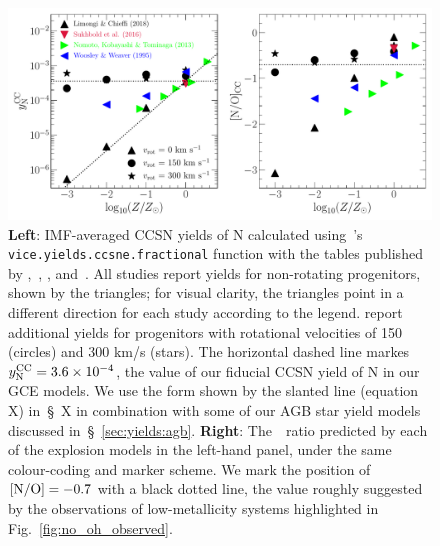 \documentclass[ms.tex]{subfiles}
\begin{document}
\begin{figure}
\centering
\includegraphics[scale = 0.63]{n_cc_yields.pdf}
\caption{
\textbf{Left}: IMF-averaged CCSN yields of N calculated using~\vice's
\texttt{vice.yields.ccsne.fractional} function with the tables published by
\citet[][blue]{Woosley1995},~\citet[][green]{Nomoto2013},
\citet[][red]{Sukhbold2016}, and~\citet[][black]{Limongi2018}.
All studies report yields for non-rotating progenitors, shown by the triangles;
for visual clarity, the triangles point in a different direction for each study
according to the legend.
\citet{Limongi2018} report additional yields for progenitors with rotational
velocities of 150 (circles) and 300 km/s (stars).
The horizontal dashed line markes~$y_\text{N}^\text{CC} = 3.6\times10^{-4}$,
the value of our fiducial CCSN yield of N in our GCE models.
We use the form shown by the slanted line (equation X) in~\S~X in combination
with some of our AGB star yield models discussed in~\S~\ref{sec:yields:agb}.
\textbf{Right}: The~\no~ratio predicted by each of the explosion models in
the left-hand panel, under the same colour-coding and marker scheme.
We mark the position of~$\text{[N/O]} = -0.7$ with a black dotted line, the value
roughly suggested by the observations of low-metallicity systems highlighted
in Fig.~\ref{fig:no_oh_observed}.
}
\label{fig:n_cc_yields}
\end{figure}
\end{document}
